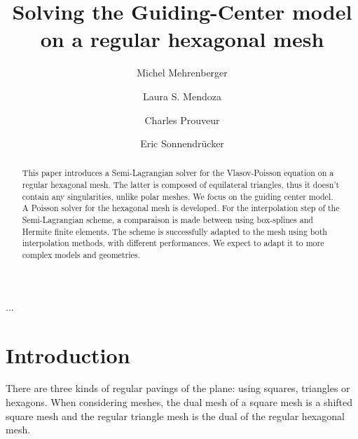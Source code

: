 \documentclass[proc]{edpsmath}
\begin{document}

\title{Solving the Guiding-Center model\\on a regular hexagonal mesh}%
%
\author{Michel Mehrenberger} \address{IRMA, Universit\'e de Strasbourg, 7, rue Ren\'e Descartes, 67084 Strasbourg \& INRIA-Nancy Grand-Est, projet TONUS, 
}
\author{Laura S. Mendoza} \address{Max-Planck-Institut f\"{u}r Plasmaphysik, Boltzmannstr. 2, D-85748 Garching, } 
\author{Charles Prouveur}\address{...} %
\author{Eric Sonnendr\"{u}cker}
%
%


\begin{abstract} 
This paper introduces a Semi-Lagrangian solver for the Vlasov-Poisson equation on a regular hexagonal mesh. The latter is composed of equilateral triangles, thus it doesn't contain any singularities, unlike polar meshes. We focus on the guiding center model. A Poisson solver for the hexagonal mesh is developed. For the interpolation step of the Semi-Lagrangian scheme, a comparaison is made between using box-splines and Hermite finite elements. The scheme is successfully adapted to the mesh using both interpolation methods, with different performances. We expect to adapt it to more complex models and geometries.
\end{abstract}

\begin{resume} 
...
\end{resume}


\maketitle


\section*{Introduction}


There are three kinds of regular pavings of the plane: using squares, triangles or hexagons. When considering meshes, the dual mesh of a square mesh is a shifted square mesh and the regular triangle mesh is the dual of the regular hexagonal mesh.
\end{document}

